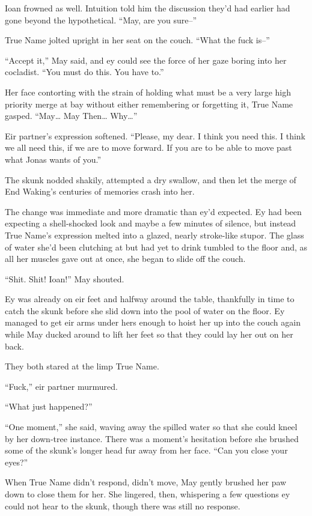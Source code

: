 Ioan frowned as well. Intuition told him the discussion they'd had earlier had gone beyond the hypothetical. ``May, are you sure--''

True Name jolted upright in her seat on the couch. ``What the fuck is--''

``Accept it,'' May said, and ey could see the force of her gaze boring into her cocladist. ``You must do this. You have to.''

Her face contorting with the strain of holding what must be a very large high priority merge at bay without either remembering or forgetting it, True Name gasped. ``May\ldots{} May Then\ldots{} Why\ldots{}''

Eir partner's expression softened. ``Please, my dear. I think you need this. I think we all need this, if we are to move forward. If you are to be able to move past what Jonas wants of you.''

The skunk nodded shakily, attempted a dry swallow, and then let the merge of End Waking's centuries of memories crash into her.

The change was immediate and more dramatic than ey'd expected. Ey had been expecting a shell-shocked look and maybe a few minutes of silence, but instead True Name's expression melted into a glazed, nearly stroke-like stupor. The glass of water she'd been clutching at but had yet to drink tumbled to the floor and, as all her muscles gave out at once, she began to slide off the couch.

``Shit. Shit! Ioan!'' May shouted.

Ey was already on eir feet and halfway around the table, thankfully in time to catch the skunk before she slid down into the pool of water on the floor. Ey managed to get eir arms under hers enough to hoist her up into the couch again while May ducked around to lift her feet so that they could lay her out on her back.

They both stared at the limp True Name.

``Fuck,'' eir partner murmured.

``What just happened?''

``One moment,'' she said, waving away the spilled water so that she could kneel by her down-tree instance. There was a moment's hesitation before she brushed some of the skunk's longer head fur away from her face. ``Can you close your eyes?''

When True Name didn't respond, didn't move, May gently brushed her paw down to close them for her. She lingered, then, whispering a few questions ey could not hear to the skunk, though there was still no response.

